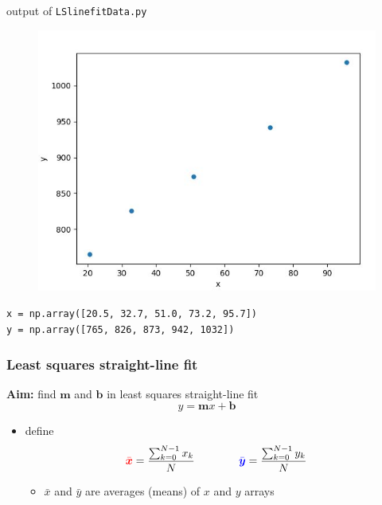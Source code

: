 \documentclass[english,14pt]{beamer}
\newcommand\red[1]{{\color{red} #1}}
\newcommand\blue[1]{{\color{blue} #1}}
\begin{document}

\begin{frame}[fragile]

\frametitle{}

output of \texttt{LSlinefitData.py}
\vspace*{-3mm}
\begin{figure}[ht]
	\centering
	\includegraphics[width=.74\textwidth]{figures/LSlinefitDataOutput}
\end{figure}
\vspace*{-3mm}
{\small \texttt{x = np.array([20.5, 32.7, 51.0, 73.2, 95.7]) } \\
\texttt{y = np.array([765, 826, 873, 942, 1032]) }
}

\end{frame}


\begin{frame}[fragile]

\frametitle{Least squares straight-line fit}

\textbf{Aim:} find $\mathbf{m}$ and $\mathbf{b}$ in least squares straight-line fit
\[
\boxed{
y = \mathbf{m}x + \mathbf{b}}
\]

\begin{itemize}
	\item define
\[
\red{\bar{\boldsymbol{x}}} = \frac{\sum_{k=0}^{N-1} x_k} {N} \qquad\qquad
\blue{\bar{\boldsymbol{y}}} = \frac{\sum_{k=0}^{N-1} y_k} {N}
\]
	\begin{itemize}
		\item $\bar{x}$ and $\bar{y}$ are averages (means) of $x$ and $y$ arrays
	\end{itemize}
\end{itemize}

\end{frame}
\end{document}
